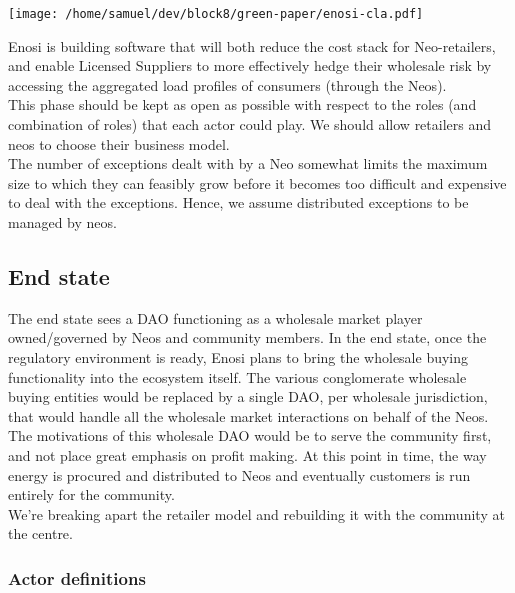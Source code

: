 \documentclass{article}
\theoremstyle{definition}
\theoremstyle{plain} %
\begin{document}
\vspace{2mm}
\begin{center}
\texttt{[image: /home/samuel/dev/block8/green-paper/enosi-cla.pdf]}
\end{center}
\vspace{2mm}

\noindent Enosi is building software that will both reduce the cost stack for Neo-retailers, and enable Licensed Suppliers to more effectively hedge their wholesale risk by accessing the aggregated load profiles of consumers (through the Neos). \\

\noindent This phase should be kept as open as possible with respect to the roles (and combination of roles) that each actor could play. We should allow retailers and neos to choose their business model. \\

\noindent The number of exceptions dealt with by a Neo somewhat limits the maximum size to which they can feasibly grow before it becomes too difficult and expensive to deal with the exceptions. Hence, we assume distributed exceptions to be managed by neos.

\subsection{End state}

The end state sees a DAO functioning as a wholesale market player owned/governed by Neos and community members. In the end state, once the regulatory environment is ready, Enosi plans to bring the wholesale buying functionality into the ecosystem itself. The various conglomerate wholesale buying entities would be replaced by a single DAO, per wholesale jurisdiction, that would handle all the wholesale market interactions on behalf of the Neos. 
The motivations of this wholesale DAO would be to serve the community first, and not place great emphasis on profit making. At this point in time, the way energy is procured and distributed to Neos and eventually customers is run entirely for the community. \\

\noindent We’re breaking apart the retailer model and rebuilding it with the community at the centre. 

\subsubsection{Actor definitions}
\end{document}
